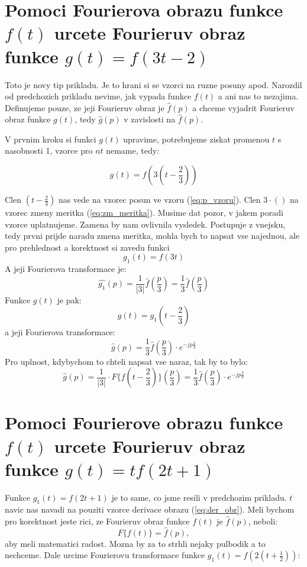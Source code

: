 \newpage

\section{Pomoci Fourierova obrazu funkce $f(t)$ urcete Fourieruv obraz funkce $g(t)=f(3t-2)$}

Toto je novy tip prikladu. Je to hrani si se vzorci na ruzne posuny apod. Narozdil od predchozich prikladu nevime, jak vypada funkce $f(t)$ a ani nas to nezajima. Definujeme pouze, ze jeji Fourieruv obraz je $\hat{f}(p)$ a chceme vyjadrit Fourieruv obraz funkce $g(t)$, tedy $\hat{g}(p)$ v zavislosti na $\hat{f}(p)$. 

V prvnim kroku si funkci $g(t)$ upravime, potrebujeme ziskat promenou $t$ s nasobnosti 1, vzorce pro $nt$ nemame, tedy:

$$g(t) = f(3\left(t-\frac{2}{3}\right))$$

Clen $\left(t-\frac{2}{3}\right)$ nas vede na vzorec posun ve vzoru (\ref{eq:p_vzoru}). Clen $3\cdot()$ na vzorec zmeny meritka (\ref{eq:zm_meritka}). Musime dat pozor, v jakem poradi vzorce uplatnujeme. Zamena by nam ovlivnila vysledek. Postupuje z vnejsku, tedy prvni prijde naradu zmena meritka, mohla bych to napsat vse najednou, ale pro prehlednost a korektnost si zavedu funkci 
$$g_1(t)=f(3t)$$
A jeji Fourierova transformace je:
$$\hat{g_1}(p) = \frac{1}{|3|} \hat{f}\left( \frac{p}{3}\right) =  \frac{1}{3} \hat{f}\left( \frac{p}{3}\right)$$
Funkce $g(t)$ je pak:
$$g(t) = g_1 \left( t-\frac{2}{3} \right)$$ 
a jeji Fourierova transformace:
$$\hat{g}(p) = \frac{1}{3} \hat{f}\left( \frac{p}{3}\right)\cdot e^{-jp\frac{2}{3}}$$
Pro uplnost, kdybychom to chteli napsat vse naraz, tak by to bylo:
$$\hat{g}(p) = \frac{1}{|3|} \cdot F\{ f\left(t-\frac{2}{3}\right) \} \left( \frac{p}{3}\right) = \frac{1}{3} \hat{f}\left( \frac{p}{3}\right)\cdot e^{-jp\frac{2}{3}}$$

\newpage
\section{Pomoci Fourierove obrazu funkce $f(t)$ urcete Fourieruv obraz funkce $g(t)=tf(2t+1)$}

Funkce $g_1(t)=f(2t+1)$ je to same, co jsme resili v predchozim prikladu. $t$ navic nas navadi na pouziti vzorce derivace obrazu (\ref{eq:der_obr}). Meli bychom pro korektnost jeste rici, ze Fourieruv obraz funkce $f(t)$ je $\hat{f}(p)$, neboli:
$$F\{ f(t) \} = \hat{f}(p),$$
aby meli matematici radost. Mozna by za to strhli nejaky pulbodik a to nechceme. Dale urcime Fourierovu transformace funkce $g_1(t)= f(2\left(t+\frac{1}{2}\right))$:


